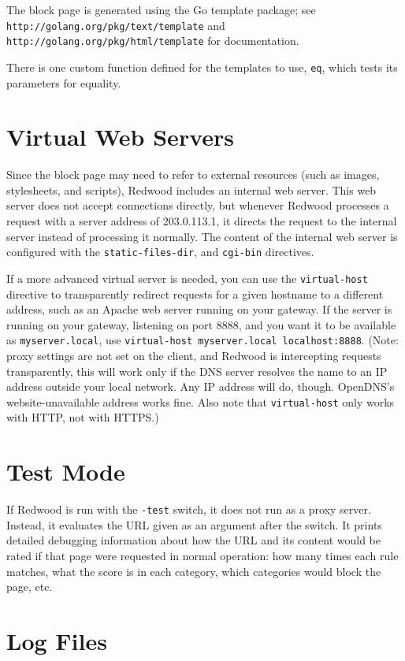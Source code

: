 \documentclass{article}
\begin{document}
The block page is generated using the Go template package; see
\verb"http://golang.org/pkg/text/template"
and
\verb"http://golang.org/pkg/html/template"
for documentation.

There is one custom function defined for the templates to use, \verb"eq", 
which tests its parameters for equality.

\section{Virtual Web Servers}

Since the block page may need to refer to external resources
(such as images, stylesheets, and scripts),
Redwood includes an internal web server.
This web server does not accept connections directly,
but whenever Redwood processes a request with a server address of 203.0.113.1,
it directs the request to the internal server instead of processing it normally.
The content of the internal web server is configured with the 
\verb"static-files-dir", and \verb"cgi-bin" directives.

If a more advanced virtual server is needed, you can use the \verb"virtual-host"
directive to transparently redirect requests for a given hostname to a different address,
such as an Apache web server running on your gateway.
If the server is running on your gateway, listening on port 8888, and you want it to be 
available as \verb"myserver.local", use \verb"virtual-host myserver.local localhost:8888".
(Note: proxy settings are not set on the client, and Redwood is intercepting
requests transparently, this will work only if the DNS server resolves the name
to an IP address outside your local network. 
Any IP address will do, though. OpenDNS's website-unavailable address works fine.
Also note that \verb"virtual-host" only works with HTTP, not with HTTPS.)

\section{Test Mode}

If Redwood is run with the \verb"-test" switch, it does not run as a proxy server. 
Instead, it evaluates the URL given as an argument after the switch.
It prints detailed debugging information about how the URL and its content would be rated
if that page were requested in normal operation: how many times each rule matches, 
what the score is in each category, which categories would block the page, etc.

\section{Log Files}
\end{document}
